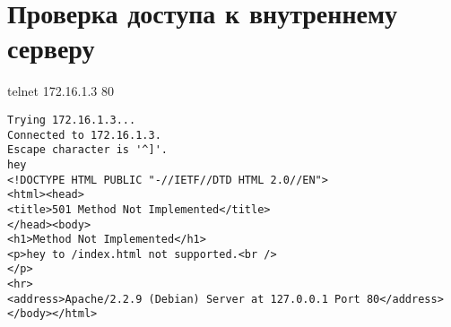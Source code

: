 \documentclass[a4paper,12pt]{article}
\begin{document}
\section{Проверка доступа к внутреннему серверу}

telnet 172.16.1.3  80

\begin{Verbatim}
Trying 172.16.1.3...
Connected to 172.16.1.3.
Escape character is '^]'.
hey
<!DOCTYPE HTML PUBLIC "-//IETF//DTD HTML 2.0//EN">
<html><head>
<title>501 Method Not Implemented</title>
</head><body>
<h1>Method Not Implemented</h1>
<p>hey to /index.html not supported.<br />
</p>
<hr>
<address>Apache/2.2.9 (Debian) Server at 127.0.0.1 Port 80</address>
</body></html>
\end{Verbatim}
\end{document}
